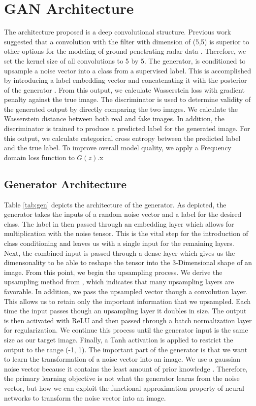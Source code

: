\section{GAN Architecture}
The architecture proposed is a deep convolutional structure. Previous work suggested that a convolution with the filter with dimension of (5,5) is superior to other options for the modeling of ground penetrating radar data \cite{5x5}. Therefore, we set the kernel size of all convolutions to 5 by 5. The generator, is conditioned to upsample a noise vector into a class from a supervised label. This is accomplished by introducing a label embedding vector and concatenating it with the posterior of the generator \cite{CGAN}. From this output, we calculate Wasserstein loss with gradient penalty \cite{WGAN-GP} against the true image. The discriminator is used to determine validity of the generated output by directly comparing the two images. We calculate the Wasserstein distance between both real and fake images. In addition, the discriminator is trained to produce a predicted label for the generated image. For this output, we calculate categorical cross entropy between the predicted label and the true label. To improve overall model quality, we apply a Frequency domain loss function to $G(z)$.x 

\subsection{Generator Architecture}
 Table \ref{tab:gen} depicts the architecture of the generator. As depicted, the generator takes the inputs of a random noise vector and a label for the desired class. The label in then passed through an embedding layer which allows for multiplication with the noise tensor. This is the vital step for the introduction of class conditioning and leaves us with a single input for the remaining layers. Next, the combined input is passed through a dense layer which gives us the dimensonality to be able to reshape the tensor into the 3-Dimensional shape of an image. From this point, we begin the upsampling process. We derive the upsampling method from \cite{lapgan}, which indicates that many upsampling layers are favorable. In addition, we pass the upsampled vector though a convolution layer. This allows us to retain only the important information that we upsampled. Each time the input passes though an upsampling layer it doubles in size. The output is then activated with ReLU \cite{relu} and then passed through a batch normalization layer for regularization. We continue this process until the generator input is the same size as our target image. Finally, a Tanh \cite{tanh} activation is applied to restrict the output to the range (-1, 1). The important part of the generator is that we want to learn the transformation of a noise vector into an image. We use a gaussian noise vector because it contains the least amount of prior knowledge \cite{Goodfellow-et-al-2016}. Therefore, the primary learning objective is not what the generator learns from the noise vector, but how we can exploit the functional approximation property of neural networks to transform the noise vector into an image.  


